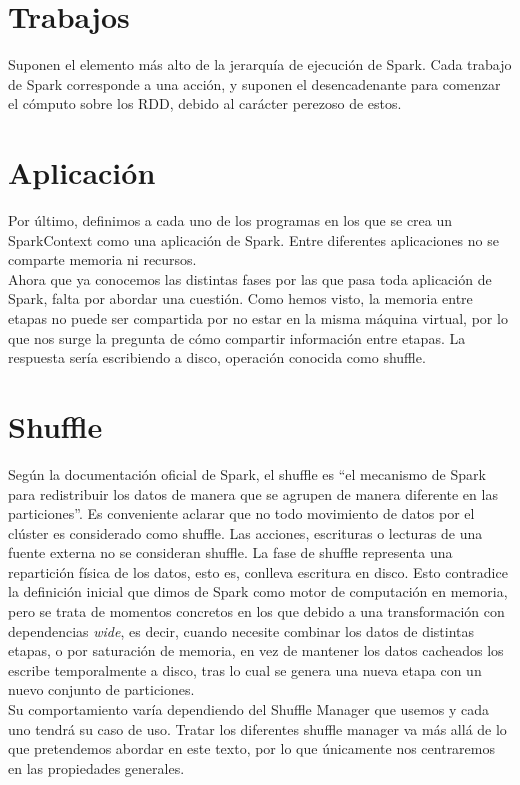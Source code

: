 \section{Trabajos}
Suponen el elemento más alto de la jerarquía de ejecución de Spark. Cada trabajo de Spark corresponde a una acción, y suponen el desencadenante para comenzar el cómputo sobre los RDD, debido al carácter perezoso de estos. \\

\section{Aplicación}
Por último, definimos a cada uno de los programas en los que se crea un SparkContext como una aplicación de Spark. Entre diferentes aplicaciones no se comparte memoria ni recursos.\\

Ahora que ya conocemos las distintas fases por las que pasa toda aplicación de Spark, falta por abordar una cuestión. Como hemos visto, la memoria entre etapas no puede ser compartida por no estar en la misma máquina virtual, por lo que nos surge la pregunta de cómo compartir información entre etapas. La respuesta sería escribiendo a disco, operación conocida como shuffle.\\

\section{Shuffle}
Según la documentación oficial de Spark, el shuffle es “el mecanismo de Spark para redistribuir los datos de manera que se agrupen de manera diferente en las particiones”. Es conveniente aclarar que no todo movimiento de datos por el clúster es considerado como shuffle. Las acciones, escrituras o lecturas de una fuente externa no se consideran shuffle. La fase de shuffle representa una repartición física de los datos, esto es, conlleva escritura en disco. Esto contradice la definición inicial que dimos de Spark como  motor de computación en memoria, pero se trata de momentos concretos en los que debido a una transformación con dependencias \textit{wide}, es decir, cuando necesite combinar los datos de distintas etapas, o por saturación de memoria, en vez de mantener los datos cacheados los escribe temporalmente a disco, tras lo cual se genera una nueva etapa con un nuevo conjunto de particiones.\\

Su comportamiento varía dependiendo del Shuffle Manager que usemos y cada uno tendrá su caso de uso. Tratar los diferentes shuffle manager va más allá de lo que pretendemos abordar en este texto, por lo que únicamente nos centraremos en las propiedades generales.\\

